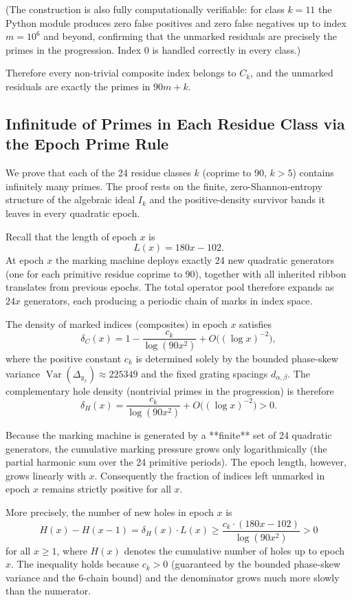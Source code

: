 \documentclass[11pt,a4paper]{article}
\begin{document}
(The construction is also fully computationally verifiable: for class $k=11$ the Python module produces zero false positives and zero false negatives up to index $m=10^6$ and beyond, confirming that the unmarked residuals are precisely the primes in the progression. Index $0$ is handled correctly in every class.)

Therefore every non-trivial composite index belongs to $C_k$, and the unmarked residuals are exactly the primes in $90m+k$.


\subsection{Infinitude of Primes in Each Residue Class via the Epoch Prime Rule}

We prove that each of the 24 residue classes \(k\) (coprime to 90, \(k>5\)) contains infinitely many primes. The proof rests on the finite, zero-Shannon-entropy structure of the algebraic ideal \(I_k\) and the positive-density survivor bands it leaves in every quadratic epoch.

Recall that the length of epoch \(x\) is
\[
L(x) = 180x - 102.
\]
At epoch \(x\) the marking machine deploys exactly 24 new quadratic generators (one for each primitive residue coprime to 90), together with all inherited ribbon translates from previous epochs. The total operator pool therefore expands as \(24x\) generators, each producing a periodic chain of marks in index space.

The density of marked indices (composites) in epoch \(x\) satisfies
\[
\delta_C(x) = 1 - \frac{c_k}{\log(90x^2)} + O\bigl((\log x)^{-2}\bigr),
\]
where the positive constant \(c_k\) is determined solely by the bounded phase-skew variance \(\operatorname{Var}(\Delta_{y_x})\approx225349\) and the fixed grating spacings \(d_{\alpha,\beta}\). The complementary hole density (nontrivial primes in the progression) is therefore
\[
\delta_H(x) = \frac{c_k}{\log(90x^2)} + O\bigl((\log x)^{-2}\bigr) > 0.
\]

Because the marking machine is generated by a **finite** set of 24 quadratic generators, the cumulative marking pressure grows only logarithmically (the partial harmonic sum over the 24 primitive periods). The epoch length, however, grows linearly with \(x\). Consequently the fraction of indices left unmarked in epoch \(x\) remains strictly positive for all \(x\).

More precisely, the number of new holes in epoch \(x\) is
\[
H(x) - H(x-1) = \delta_H(x) \cdot L(x) \geq \frac{c_k \cdot (180x - 102)}{\log(90x^2)} > 0
\]
for all \(x \geq 1\), where \(H(x)\) denotes the cumulative number of holes up to epoch \(x\). The inequality holds because \(c_k > 0\) (guaranteed by the bounded phase-skew variance and the 6-chain bound) and the denominator grows much more slowly than the numerator.
\end{document}
